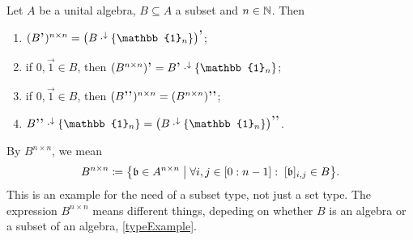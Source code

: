 \begin{lemma} \label{commutantsMatrixAlgebrasLemma}
Let $A$ be a unital algebra, $B\subseteq A$ a subset and $n\in \mathbb{N}$. Then
\begin{enumerate}
\item $(B^{\comm})^{n\times n} = \big(B\cdot^\imf\{\mathbb{1}_n\}\big)^{\comm}$;
\item if $0,\vec{1}\in B$, then $(B^{n\times n})^{\comm} = B^{\comm}\cdot^\imf\{\mathbb{1}_n\}$;
\item if $0,\vec{1}\in B$, then $(B^{\comm\comm})^{n\times n} = (B^{n\times n})^{\comm\comm}$;
\item $B^{\comm\comm}\cdot^\imf\{\mathbb{1}_n\} = \big(B\cdot^\imf\{\mathbb{1}_n\}\big)^{\comm\comm}$.
\end{enumerate}
\end{lemma}
By $B^{n\times n}$, we mean
\[ B^{n\times n} \defeq \setbuilder{\mathfrak{b} \in A^{n\times n}}{\forall i,j\in [0:n-1]: \; [\mathfrak{b}]_{i,j} \in B}. \]
This is an example for the need of a subset type, not just a set type. The expression $B^{n\times n}$ means different things, depeding on whether $B$ is an algebra or a subset of an algebra, \ref{typeExample}.
